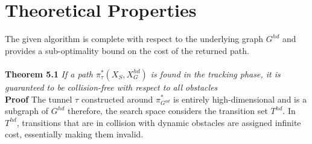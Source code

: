 \section{Theoretical Properties}
\label{sec:theory}
The given algorithm is complete with respect to the underlying graph $G^{hd}$ and provides a sub-optimality bound on the cost of the returned path. \\ \\
\textbf{Theorem 5.1} \textit{If a path $\pi_\tau^*(X_S,X_G^{hd})$ is found in the tracking phase, it is guaranteed to be collision-free with respect to all obstacles} \\
\textbf{Proof} The tunnel $\tau$ constructed around $\pi_{G^{ad}}^*$ is entirely high-dimensional and is a subgraph of $G^{hd}$ therefore, the search space considers the transition set $T^{hd}$. In $T^{hd}$, transitions that are in collision with dynamic obstacles are assigned infinite cost, essentially making them invalid.


